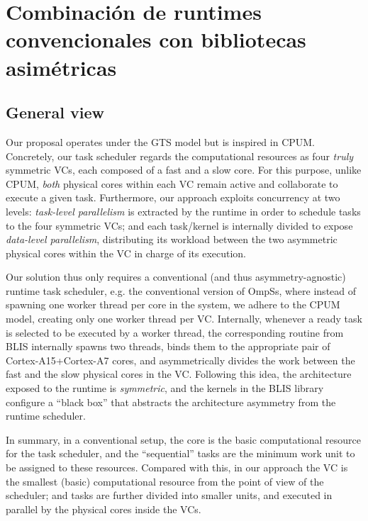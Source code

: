 \section{Combinación de runtimes convencionales con bibliotecas asimétricas}

\subsection{General view}
Our proposal operates under the GTS model but is inspired in CPUM. Concretely,
our task scheduler regards
the computational resources as four {\em truly} symmetric VCs, each composed of a fast and a slow core. For this purpose, 
unlike CPUM, {\em both} physical cores within each VC remain active and collaborate to execute a given task.
Furthermore, our approach exploits concurrency at two levels: {\em task-level parallelism} is extracted by the runtime in order
to schedule tasks to the four symmetric VCs;
and each task/kernel is internally divided to 
expose {\em data-level parallelism}, distributing its workload between the two asymmetric physical cores within the VC
in charge of its execution.

Our solution thus only requires a conventional 
(and thus asymmetry-agnostic) runtime task scheduler, e.g. the conventional version of OmpSs, where instead of spawning one worker thread
per core in the system, we adhere to the CPUM model, creating only one worker thread per VC.
Internally, whenever a ready task is selected to be executed by a worker thread, 
the corresponding routine from BLIS internally spawns two threads, 
binds them to the appropriate pair of Cortex-A15+Cortex-A7 cores, 
and asymmetrically divides the work between the fast and the slow physical cores in the VC.
Following this idea, the architecture exposed to the runtime is {\em symmetric}, 
and the kernels in the BLIS library configure a ``black box'' that abstracts the 
architecture asymmetry from the runtime scheduler. 

In summary, in a conventional setup, the core is the basic computational resource for the task scheduler, 
and the ``sequential'' tasks are the minimum work unit to be assigned to these resources. Compared with this, in our approach the VC 
is the smallest (basic) computational resource from the point of view of the scheduler;
and tasks are further divided into smaller units, and executed in parallel by the physical cores inside the VCs.

